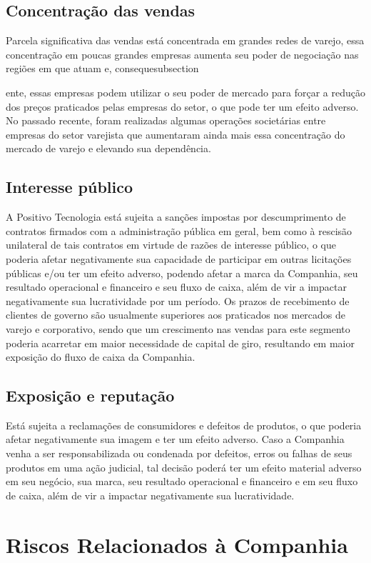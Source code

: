 \subsection{Concentração das vendas} 
Parcela significativa das vendas está concentrada em grandes redes de varejo, essa  concentração em poucas grandes empresas aumenta seu poder de negociação nas regiões em que atuam e, consequesubsection{ente, essas empresas podem utilizar o seu poder de mercado para forçar a redução dos preços praticados pelas empresas do setor, o que pode ter um efeito adverso. No passado recente, foram realizadas algumas operações societárias entre empresas do setor varejista que aumentaram ainda mais essa concentração do mercado de varejo e elevando sua dependência.

\subsection{Interesse público}
A Positivo Tecnologia está sujeita a sanções impostas por descumprimento de contratos firmados com a administração pública em geral, bem como à rescisão unilateral de tais contratos em virtude de razões de interesse público, o que poderia afetar negativamente sua capacidade de participar em outras licitações públicas e/ou ter um efeito adverso, podendo afetar a marca da Companhia, seu resultado operacional e financeiro e seu fluxo de caixa, além de vir a impactar negativamente sua lucratividade por um período. Os prazos de recebimento de clientes de governo são usualmente superiores aos praticados nos mercados de varejo e corporativo, sendo que um crescimento nas vendas para este segmento poderia acarretar em maior necessidade de capital de giro, resultando em maior exposição do fluxo de caixa da Companhia.

\subsection{Exposição e reputação}
Está sujeita a reclamações de consumidores e defeitos de produtos, o que poderia afetar negativamente sua imagem e ter um efeito adverso. Caso a Companhia venha a ser responsabilizada ou condenada por defeitos, erros ou falhas de seus produtos em uma ação judicial, tal decisão poderá ter um efeito material adverso em seu negócio, sua marca, seu resultado operacional e financeiro e em seu fluxo de caixa, além de vir a impactar negativamente sua lucratividade.

\section{Riscos Relacionados à Companhia}

}
